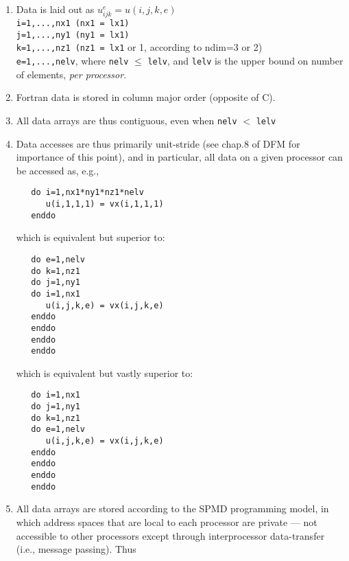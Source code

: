 \begin{enumerate}
\item
Data is laid out as  \(u_{ijk}^e = u(i,j,k,e)\) \\

{\tt   i=1,...,nx1   (nx1 = lx1)} \\
{\tt   j=1,...,ny1   (ny1 = lx1)} \\
{\tt   k=1,...,nz1   (nz1 = lx1} or 1, according to ndim=3 or 2) \\

{\tt   e=1,...,nelv}, where {\tt nelv} \(\le\) {\tt lelv}, and {\tt lelv} is the upper
                 bound on number of elements, {\em per processor}.


\item
 Fortran data is stored in column major order (opposite of C).

\item
 All data arrays are thus contiguous, even when {\tt nelv} \(<\) {\tt lelv}

\item Data accesses are thus primarily unit-stride (see chap.8 of DFM
   for importance of this point), and in particular, all data on
   a given processor can be accessed as, e.g.,


\begin{verbatim}
   do i=1,nx1*ny1*nz1*nelv
      u(i,1,1,1) = vx(i,1,1,1)
   enddo
\end{verbatim}

   which is equivalent but superior to:

\begin{verbatim}
   do e=1,nelv
   do k=1,nz1
   do j=1,ny1
   do i=1,nx1
      u(i,j,k,e) = vx(i,j,k,e)
   enddo
   enddo
   enddo
   enddo
\end{verbatim}


   which is equivalent but vastly superior to:

\begin{verbatim}
   do i=1,nx1
   do j=1,ny1
   do k=1,nz1
   do e=1,nelv
      u(i,j,k,e) = vx(i,j,k,e)
   enddo
   enddo
   enddo
   enddo
\end{verbatim}


\item All data arrays are stored according to the SPMD programming
   model, in which address spaces that are local to each processor
   are private --- not accessible to other processors except through
   interprocessor data-transfer (i.e., message passing).  Thus


\end{enumerate}
